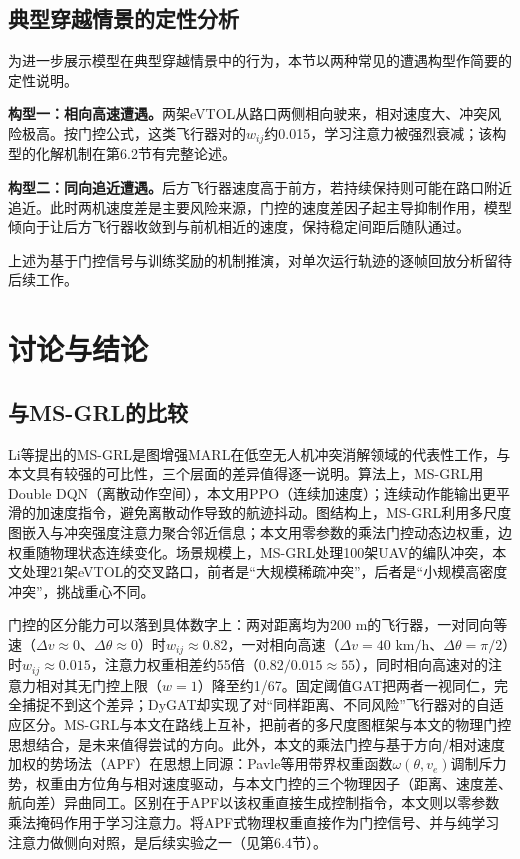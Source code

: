 \documentclass[12pt,a4paper,UTF8]{ctexart}
\begin{document}
\subsection{典型穿越情景的定性分析}

为进一步展示模型在典型穿越情景中的行为，本节以两种常见的遭遇构型作简要的定性说明。

\textbf{构型一：相向高速遭遇。}两架eVTOL从路口两侧相向驶来，相对速度大、冲突风险极高。按门控公式，这类飞行器对的$w_{ij}$约0.015，学习注意力被强烈衰减；该构型的化解机制在第6.2节有完整论述。

\textbf{构型二：同向追近遭遇。}后方飞行器速度高于前方，若持续保持则可能在路口附近追近。此时两机速度差是主要风险来源，门控的速度差因子起主导抑制作用，模型倾向于让后方飞行器收敛到与前机相近的速度，保持稳定间距后随队通过。

上述为基于门控信号与训练奖励的机制推演，对单次运行轨迹的逐帧回放分析留待后续工作。

\section{讨论与结论}

\subsection{与MS-GRL的比较}

Li等\cite{ref10}提出的MS-GRL是图增强MARL在低空无人机冲突消解领域的代表性工作，与本文具有较强的可比性，三个层面的差异值得逐一说明。算法上，MS-GRL用Double DQN（离散动作空间），本文用PPO（连续加速度）；连续动作能输出更平滑的加速度指令，避免离散动作导致的航迹抖动。图结构上，MS-GRL利用多尺度图嵌入与冲突强度注意力聚合邻近信息；本文用零参数的乘法门控动态边权重，边权重随物理状态连续变化。场景规模上，MS-GRL处理100架UAV的编队冲突，本文处理21架eVTOL的交叉路口，前者是“大规模稀疏冲突”，后者是“小规模高密度冲突”，挑战重心不同。

门控的区分能力可以落到具体数字上：两对距离均为200 m的飞行器，一对同向等速（$\Delta v\approx0$、$\Delta\theta\approx0$）时$w_{ij}\approx0.82$，一对相向高速（$\Delta v=40$ $\mathrm{km/h}$、$\Delta\theta=\pi/2$）时$w_{ij}\approx0.015$，注意力权重相差约55倍（$0.82/0.015\approx55$），同时相向高速对的注意力相对其无门控上限（$w=1$）降至约1/67。固定阈值GAT把两者一视同仁，完全捕捉不到这个差异；DyGAT却实现了对“同样距离、不同风险”飞行器对的自适应区分。MS-GRL与本文在路线上互补，把前者的多尺度图框架与本文的物理门控思想结合，是未来值得尝试的方向。此外，本文的乘法门控与基于方向/相对速度加权的势场法（APF）在思想上同源：Pavle等\cite{ref56}用带界权重函数$\omega(\theta, v_e)$调制斥力势，权重由方位角与相对速度驱动，与本文门控的三个物理因子（距离、速度差、航向差）异曲同工。区别在于APF以该权重直接生成控制指令，本文则以零参数乘法掩码作用于学习注意力。将APF式物理权重直接作为门控信号、并与纯学习注意力做侧向对照，是后续实验之一（见第6.4节）。
\end{document}
